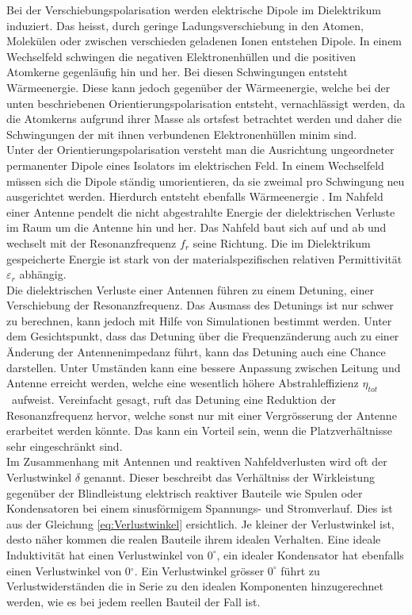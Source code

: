Bei der Verschiebungspolarisation werden elektrische Dipole im Dielektrikum induziert. Das heisst, durch geringe Ladungsverschiebung in den Atomen, Molekülen oder zwischen verschieden geladenen Ionen entstehen Dipole. In einem Wechselfeld schwingen die negativen Elektronenhüllen und die positiven Atomkerne gegenläufig hin und her. Bei diesen Schwingungen entsteht Wärmeenergie. Diese kann jedoch gegenüber der Wärmeenergie, welche bei der unten beschriebenen Orientierungspolarisation entsteht, vernachlässigt werden, da  die Atomkerns aufgrund ihrer Masse als ortsfest betrachtet werden und daher die Schwingungen der mit ihnen verbundenen Elektronenhüllen minim sind.\\
Unter der Orientierungspolarisation versteht man die Ausrichtung ungeordneter permanenter Dipole eines Isolators im elektrischen Feld. In einem Wechselfeld müssen sich die Dipole ständig umorientieren, da sie zweimal pro Schwingung neu ausgerichtet werden. Hierdurch entsteht ebenfalls Wärmeenergie \cite{DielektrikumPolarisation}. Im Nahfeld einer Antenne pendelt die nicht abgestrahlte Energie der dielektrischen Verluste im Raum um die Antenne hin und her. Das Nahfeld baut sich auf und ab und wechselt mit der Resonanzfrequenz $f_{r}$ seine Richtung. Die im Dielektrikum gespeicherte Energie ist stark von der materialspezifischen relativen Permittivität $\varepsilon_r $ abhängig.\\
\newpage
Die dielektrischen Verluste einer Antennen führen zu einem Detuning, einer Verschiebung der Resonanzfrequenz. Das Ausmass des Detunings ist nur schwer zu berechnen, kann jedoch mit Hilfe von Simulationen bestimmt werden. Unter dem Gesichtspunkt, dass das Detuning über die Frequenzänderung auch zu einer Änderung der Antennenimpedanz führt, kann das Detuning auch eine Chance darstellen. Unter Umständen kann eine bessere Anpassung zwischen Leitung und Antenne erreicht werden, welche eine wesentlich höhere Abstrahleffizienz $\eta_{tot}$ \ aufweist. Vereinfacht gesagt, ruft das Detuning  eine Reduktion der Resonanzfrequenz hervor, welche sonst nur mit einer Vergrösserung der Antenne erarbeitet werden könnte. Das kann ein Vorteil sein, wenn die Platzverhältnisse sehr eingeschränkt sind.\\
Im Zusammenhang mit Antennen und reaktiven Nahfeldverlusten wird oft der Verlustwinkel $\delta$ genannt. Dieser beschreibt das Verhältniss der Wirkleistung gegenüber der Blindleistung elektrisch reaktiver Bauteile wie Spulen oder Kondensatoren bei einem sinusförmigem Spannungs- und Stromverlauf. Dies ist aus der Gleichung \ref{eq:Verlustwinkel} ersichtlich. Je kleiner der Verlustwinkel ist, desto näher kommen die realen Bauteile ihrem idealen Verhalten. Eine ideale Induktivität hat einen Verlustwinkel von $0^\circ$, ein idealer Kondensator hat ebenfalls einen Verlustwinkel von 0$^\circ$. Ein Verlustwinkel grösser $0^\circ$ führt zu Verlustwiderständen die in Serie zu den idealen Komponenten hinzugerechnet werden, wie es bei jedem reellen Bauteil der Fall ist.\\
